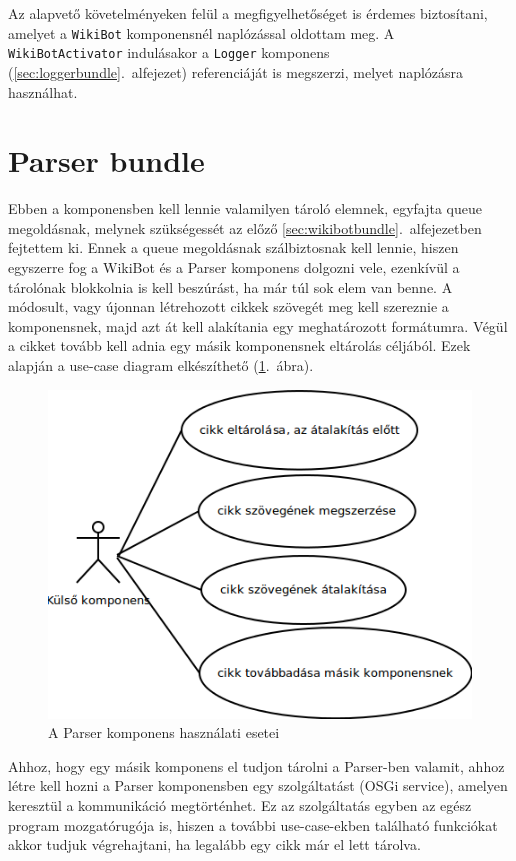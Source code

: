 Az alapvető követelményeken felül a megfigyelhetőséget is érdemes biztosítani, amelyet a \texttt{WikiBot} komponensnél naplózással oldottam meg. A \texttt{WikiBotActivator} indulásakor a \texttt{Logger} komponens (\ref{sec:loggerbundle}.~alfejezet) referenciáját is megszerzi, melyet naplózásra használhat.


\section{Parser bundle}
\label{sec:parserbundle}

Ebben a komponensben kell lennie valamilyen tároló elemnek, egyfajta queue megoldásnak, melynek szükségessét az előző \ref{sec:wikibotbundle}.~alfejezetben fejtettem ki. Ennek a queue megoldásnak szálbiztosnak kell lennie, hiszen egyszerre fog a WikiBot és a Parser komponens dolgozni vele, ezenkívül a tárolónak blokkolnia is kell beszúrást, ha már túl sok elem van benne. A módosult, vagy újonnan létrehozott cikkek szövegét meg kell szereznie a komponensnek, majd azt át kell alakítania egy meghatározott formátumra. Végül a cikket tovább kell adnia egy másik komponensnek eltárolás céljából. Ezek alapján a use-case diagram elkészíthető (\ref{fig:usecase_parser}.~ábra).

\begin{figure}[htp]
\centering
\includegraphics[scale=0.5]{img/usecase_parser}
\caption{A Parser komponens használati esetei}
\label{fig:usecase_parser}
\end{figure}

Ahhoz, hogy egy másik komponens el tudjon tárolni a Parser-ben valamit, ahhoz létre kell hozni a Parser komponensben egy szolgáltatást (OSGi service), amelyen keresztül a kommunikáció megtörténhet. Ez az szolgáltatás egyben az egész program mozgatórugója is, hiszen a további use-case-ekben található funkciókat akkor tudjuk végrehajtani, ha legalább egy cikk már el lett tárolva.

